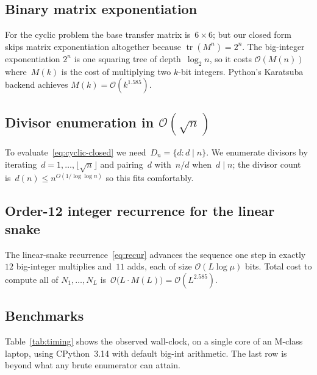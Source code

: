 \documentclass[11pt,a4paper]{article}
\theoremstyle{definition}
\theoremstyle{plain}
\DeclareMathOperator{\tr}{tr}
\newcommand{\bigo}{\mathcal{O}}
\begin{document}
\subsection{Binary matrix exponentiation}
For the cyclic problem the base transfer matrix is~$6\times 6$; but our
closed form skips matrix exponentiation altogether because
$\tr(M^n) = 2^n$.  The big-integer exponentiation $2^n$ is one squaring
tree of depth~$\log_2 n$, so it costs $\bigo(M(n))$ where~$M(k)$ is the
cost of multiplying two $k$-bit integers.  Python's Karatsuba backend
achieves $M(k) = \bigo(k^{1.585})$.

\subsection{Divisor enumeration in $\bigo(\sqrt n)$}
To evaluate~\eqref{eq:cyclic-closed} we need~$D_n = \{d : d\mid n\}$.  We
enumerate divisors by iterating~$d = 1, \dots, \lfloor\sqrt n\rfloor$ and
pairing~$d$ with~$n/d$ when~$d \mid n$; the divisor count is~$d(n) \le
n^{O(1/\log\log n)}$ so this fits comfortably.

\subsection{Order-12 integer recurrence for the linear snake}
The linear-snake recurrence~\eqref{eq:recur} advances the sequence one
step in exactly~$12$ big-integer multiplies and~$11$ adds, each of size
$\bigo(L\log\mu)$ bits.  Total cost to compute all of $N_1, \dots, N_L$
is~$\bigo\bigl(L \cdot M(L)\bigr) = \bigo(L^{2.585})$.

\subsection{Benchmarks}

Table~\ref{tab:timing} shows the observed wall-clock, on a single core
of an M-class laptop, using CPython~3.14 with default big-int arithmetic.
The last row is beyond what any brute enumerator can attain.
\end{document}
